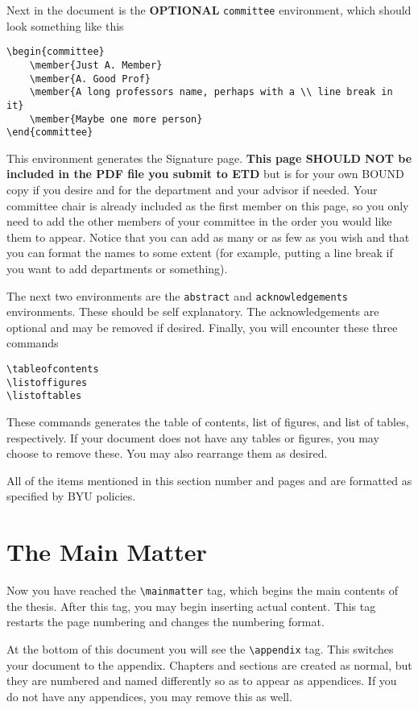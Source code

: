\documentclass[12pt]{thesis}
\begin{document}
Next in the document is the \textbf{OPTIONAL} \texttt{committee} environment, which should look something like this
\begin{verbatim}
\begin{committee}
	\member{Just A. Member}
	\member{A. Good Prof}
	\member{A long professors name, perhaps with a \\ line break in it}
	\member{Maybe one more person}
\end{committee}	
\end{verbatim}
This environment generates the Signature page.  \textbf{This page SHOULD NOT be included in the PDF file you submit to ETD} but is for your own BOUND copy if you desire and for the department and your advisor if needed. Your committee chair is already included as the first member on this page, so you only need to add the other members of your committee in the order you would like them to appear. Notice that you can add as many or as few as you wish and that you can format the names to some extent (for example, putting a line break if you want to add departments or something).

The next two environments are the \texttt{abstract} and \texttt{acknowledgements} environments. These should be self explanatory. The acknowledgements are optional and may be removed if desired. Finally, you will encounter these three commands
\begin{verbatim}
\tableofcontents
\listoffigures
\listoftables
\end{verbatim}
These commands generates the table of contents, list of figures, and list of tables, respectively. If your document does not have any tables or figures, you may choose to remove these. You may also rearrange them as desired.

All of the items mentioned in this section number and pages and are formatted as specified by BYU policies.

\section{The Main Matter}
Now you have reached the \verb=\mainmatter= tag, which begins the main contents of the thesis. After this tag, you may begin inserting actual content. This tag restarts the page numbering and changes the numbering format.

At the bottom of this document you will see the \verb=\appendix= tag. This switches your document to the appendix. Chapters and sections are created as normal, but they are numbered and named differently so as to appear as appendices. If you do not have any appendices, you may remove this as well.
\end{document}
